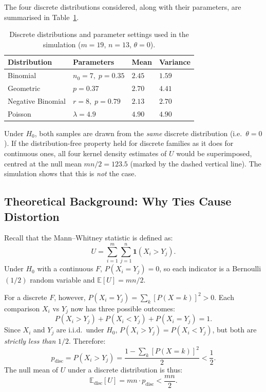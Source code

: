 \documentclass[10pt]{article}
\begin{document}
The four discrete distributions considered, along with their
parameters, are summarised in Table~\ref{tab:disc_params}.

\begin{table}[H]
\centering
\caption{Discrete distributions and parameter settings used in the
         simulation ($m = 19$, $n = 13$, $\theta = 0$).}
\label{tab:disc_params}
\begin{tabular}{llll}
\toprule
Distribution     & Parameters & Mean & Variance \\
\midrule
Binomial         & $n_0 = 7,\; p = 0.35$  & $2.45$ & $1.59$ \\
Geometric        & $p = 0.37$              & $2.70$ & $4.41$ \\
Negative Binomial& $r = 8,\; p = 0.79$    & $2.13$ & $2.70$ \\
Poisson          & $\lambda = 4.9$         & $4.90$ & $4.90$ \\
\bottomrule
\end{tabular}
\end{table}

Under $H_0$, both samples are drawn from the \emph{same} discrete
distribution (i.e.\ $\theta = 0$). If the distribution-free property
held for discrete families as it does for continuous ones, all four
kernel density estimates of $U$ would be superimposed, centred at
the null mean $mn/2 = 123.5$ (marked by the dashed vertical line).
The simulation shows that this is \emph{not} the case.

\subsection{Theoretical Background: Why Ties Cause Distortion}

Recall that the Mann--Whitney statistic is defined as:
\[
  U = \sum_{i=1}^{m}\sum_{j=1}^{n} \mathbf{1}(X_i > Y_j).
\]
Under $H_0$ with a continuous $F$, $P(X_i = Y_j) = 0$, so each
indicator is a Bernoulli$(1/2)$ random variable and
$\mathbb{E}[U] = mn/2$.

For a discrete $F$, however, $P(X_i = Y_j) = \sum_k [P(X=k)]^2 > 0$.
Each comparison $X_i$ vs $Y_j$ now has three possible outcomes:
\[
  P(X_i > Y_j) + P(X_i < Y_j) + P(X_i = Y_j) = 1.
\]
Since $X_i$ and $Y_j$ are i.i.d.\ under $H_0$,
$P(X_i > Y_j) = P(X_i < Y_j)$, but both are \emph{strictly less
than} $1/2$. Therefore:
\[
  p_{\text{disc}} = P(X_i > Y_j)
  = \frac{1 - \sum_k [P(X=k)]^2}{2}
  < \frac{1}{2}.
\]
The null mean of $U$ under a discrete distribution is thus:
\[
  \mathbb{E}_{\text{disc}}[U]
  = mn \cdot p_{\text{disc}}
  < \frac{mn}{2}.
\]
\end{document}
